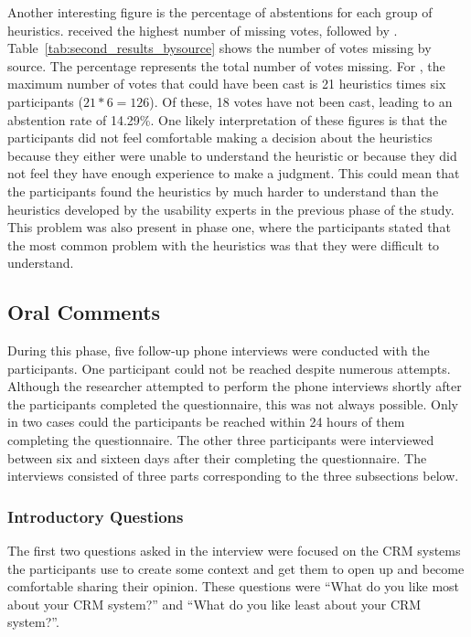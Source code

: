 Another interesting figure is the percentage of abstentions for each group of heuristics. \citet{Ardito2006} received the highest number of missing votes, followed by \citet{Nielsen1994a}. Table~\ref{tab:second_results_bysource} shows the number of votes missing by source. The percentage represents the total number of votes missing. For \citet{Ardito2006}, the maximum number of votes that could have been cast is 21 heuristics times six participants ($21*6=126$). Of these, 18 votes have not been cast, leading to an abstention rate of 14.29\%. One likely interpretation of these figures is that the participants did not feel comfortable making a decision about the heuristics because they either were unable to understand the heuristic or because they did not feel they have enough experience to make a judgment. This could mean that the participants found the heuristics by \citet{Ardito2006} much harder to understand than the heuristics developed by the usability experts in the previous phase of the study. This problem was also present in phase one, where the participants stated that the most common problem with the heuristics was that they were difficult to understand.

\subsection{Oral Comments}
During this phase, five follow-up phone interviews were conducted with the participants. One participant could not be reached despite numerous attempts. Although the researcher attempted to perform the phone interviews shortly after the participants completed the questionnaire, this was not always possible. Only in two cases could the participants be reached within 24 hours of them completing the questionnaire. The other three participants were interviewed between six and sixteen days after their completing the questionnaire. The interviews consisted of three parts corresponding to the three subsections below.

\subsubsection{Introductory Questions}
The first two questions asked in the interview were focused on the CRM systems the participants use to create some context and get them to open up and become comfortable sharing their opinion. These questions were ``What do you like most about your CRM system?'' and ``What do you like least about your CRM system?''.

